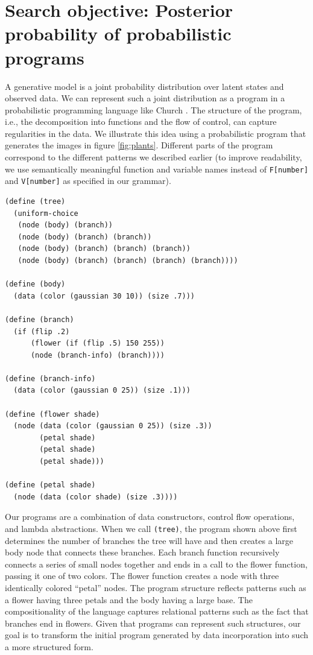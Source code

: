 \documentclass[a4paper,10pt]{article}
\begin{document}
\section{Search objective: Posterior probability of probabilistic programs}
A generative model is a joint probability distribution over latent states and observed data. We can represent such a joint distribution as a program in a probabilistic programming language like Church \cite{N.D.Goodman:2008:f2a0d}. The structure of the program, i.e., the decomposition into functions and the flow of control, can capture regularities in the data. We illustrate this idea using a probabilistic program that generates the images in figure \ref{fig:plants}. Different parts of the program correspond to the different patterns we described earlier (to improve readability, we use semantically meaningful function and variable names instead of \texttt{F[number]} and \texttt{V[number]} as specified in our grammar).  
\begin{lstlisting}[mathescape=true]
(define (tree)
  (uniform-choice
   (node (body) (branch))
   (node (body) (branch) (branch))
   (node (body) (branch) (branch) (branch))
   (node (body) (branch) (branch) (branch) (branch))))

(define (body) 
  (data (color (gaussian 30 10)) (size .7)))

(define (branch)
  (if (flip .2) 
      (flower (if (flip .5) 150 255))
      (node (branch-info) (branch))))

(define (branch-info)
  (data (color (gaussian 0 25)) (size .1)))

(define (flower shade)
  (node (data (color (gaussian 0 25)) (size .3))
        (petal shade)
        (petal shade)
        (petal shade)))

(define (petal shade)
  (node (data (color shade) (size .3))))
\end{lstlisting}
Our programs are a combination of data constructors, control flow operations, and lambda abstractions.  When we call \texttt{(tree)}, the program shown above first determines the number of branches the tree will have and then creates a large body node that connects these branches.  Each branch function recursively connects a series of small nodes together and ends in a call to the flower function, passing it one of two colors.  The flower function creates a node with three identically colored ``petal'' nodes.  The program structure reflects patterns such as a flower having three petals and the body having a large base.  The compositionality of the language captures relational patterns such as the fact that branches end in flowers. Given that programs can represent such structures, our goal is to transform the initial program generated by data incorporation into such a more structured form.
\end{document}
